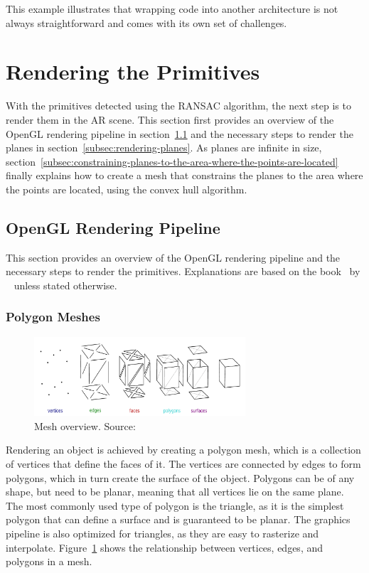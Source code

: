 This example illustrates that wrapping code into another architecture is not always straightforward and comes with its
own set of challenges.


\section{Rendering the Primitives}\label{sec:rendering-the-primitives}
With the primitives detected using the RANSAC algorithm, the next step is to render them in the AR scene.
This section first provides an overview of the OpenGL rendering pipeline in section~\ref{subsec:opengl-rendering-pipeline}
and the necessary steps to render the planes in section~\ref{subsec:rendering-planes}.
As planes are infinite in size, section~\ref{subsec:constraining-planes-to-the-area-where-the-points-are-located}
finally explains how to create a mesh that constrains the planes to the area where the points are located,
using the convex hull algorithm.

\subsection{OpenGL Rendering Pipeline}\label{subsec:opengl-rendering-pipeline}
This section provides an overview of the OpenGL rendering pipeline and the necessary steps to render the primitives.
Explanations are based on the book~ by \citeauthor{de_vries_learn_2020}~\parencite{de_vries_learn_2020} unless stated otherwise.

\subsubsection{Polygon Meshes}\label{subsec:polygon-meshes}

\begin{figure}[h]
    \centering
    \includegraphics[width=0.70\textwidth]{images/Mesh_overview}
    \caption{Mesh overview. Source:~\cite{dorner_virtual_2019}}
    \label{fig:mesh-overview}
\end{figure}

Rendering an object is achieved by creating a polygon mesh, which is a collection of vertices that define the faces of it.
The vertices are connected by edges to form polygons, which in turn create the surface of the object.
Polygons can be of any shape, but need to be planar, meaning that all vertices lie on the same plane.
The most commonly used type of polygon is the triangle, as it is the simplest polygon that can define a surface and is guaranteed to be planar.
The graphics pipeline is also optimized for triangles, as they are easy to rasterize and interpolate.
Figure~\ref{fig:mesh-overview} shows the relationship between vertices, edges, and polygons in a mesh. \cite{dorner_virtual_2019}

